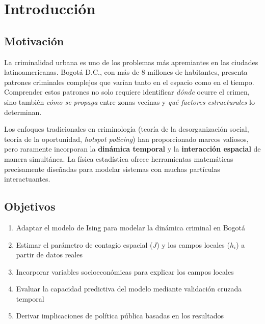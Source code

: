 \documentclass[12pt,a4paper]{article}
\begin{document}
\newpage
\tableofcontents
\newpage

\section{Introducción}

\subsection{Motivación}
La criminalidad urbana es uno de los problemas más apremiantes en las ciudades latinoamericanas. Bogotá D.C., con más de 8 millones de habitantes, presenta patrones criminales complejos que varían tanto en el espacio como en el tiempo. Comprender estos patrones no solo requiere identificar \textit{dónde} ocurre el crimen, sino también \textit{cómo se propaga} entre zonas vecinas y \textit{qué factores estructurales} lo determinan.

Los enfoques tradicionales en criminología (teoría de la desorganización social, teoría de la oportunidad, \textit{hotspot policing}) han proporcionado marcos valiosos, pero raramente incorporan la \textbf{dinámica temporal} y la \textbf{interacción espacial} de manera simultánea. La física estadística ofrece herramientas matemáticas precisamente diseñadas para modelar sistemas con muchas partículas interactuantes.

\subsection{Objetivos}
\begin{enumerate}[label=\alph*)]
    \item Adaptar el modelo de Ising para modelar la dinámica criminal en Bogotá
    \item Estimar el parámetro de contagio espacial ($J$) y los campos locales ($h_i$) a partir de datos reales
    \item Incorporar variables socioeconómicas para explicar los campos locales
    \item Evaluar la capacidad predictiva del modelo mediante validación cruzada temporal
    \item Derivar implicaciones de política pública basadas en los resultados
\end{enumerate}

\end{document}
